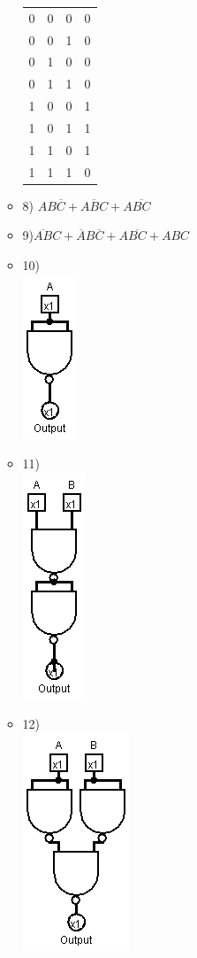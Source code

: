 \documentclass{article}
\begin{document}
\begin{itemize}
\begin{itemize}
\begin{tabular}{|c|c|c||c|}
      0 & 0 & 0 & 0 \\
      0 & 0 & 1 & 0 \\
      0 & 1 & 0 & 0 \\
      0 & 1 & 1 & 0 \\
      1 & 0 & 0 & 1 \\
      1 & 0 & 1 & 1 \\
      1 & 1 & 0 & 1 \\
      1 & 1 & 1 & 0 \\ \hline
		\end{tabular}
		\item
		8)
		$AB\overline{C}+A\overline{B}C+A\overline{BC}$
		\item
		9)$\overline{AB}C+\overline{A}B\overline{C}+A\overline{BC}+ABC$
		\item
		10)\\
    \includegraphics[scale=0.5]{chapter2problem10.png}
		\item
		11)\\
    \includegraphics[scale=0.5]{chapter2problem11.png}
		\item
		12)\\
    \includegraphics[scale=0.5]{chapter2problem12.png}
	\end{itemize}
\end{itemize}
\end{document}

